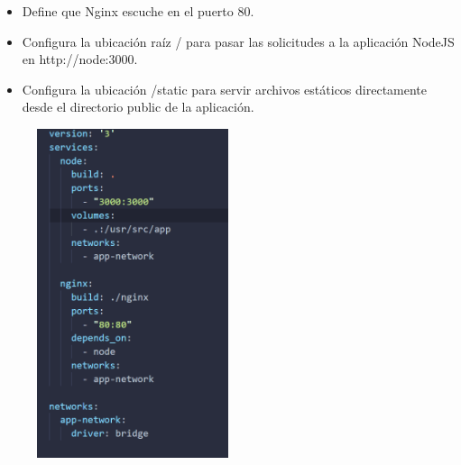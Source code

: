 \documentclass{article}
\begin{document}
\begin{itemize}
    \item Define que Nginx escuche en el puerto 80.
    \item Configura la ubicación raíz / para pasar las solicitudes a la aplicación NodeJS en http://node:3000.
    \item Configura la ubicación /static para servir archivos estáticos directamente desde el directorio public de la aplicación.
\end{itemize}
     \begin{figure}[H]
		          \centering
		          \includegraphics[width=0.5\textwidth,keepaspectratio]                       {img/dockercom.png}
    \end{figure} 
\end{document}
